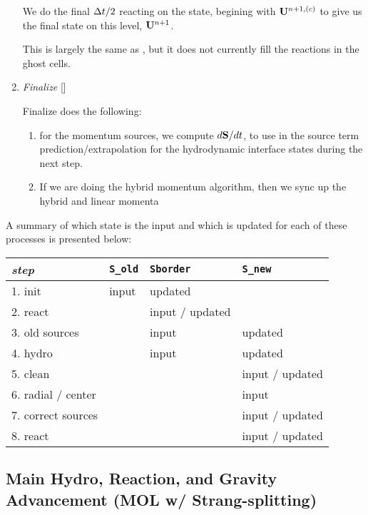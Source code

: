 \begin{enumerate}
  We do the final $\Delta t/2$ reacting on the state, begining with ${\bf U}^{n+1,(c)}$ to
  give us the final state on this level, ${\bf U}^{n+1}$.

  This is largely the same as , but
  it does not currently fill the reactions in the ghost cells. 

\item \label{strang:finalize} {\em Finalize} []

  Finalize does the following:
  \begin{enumerate}
  \item for the momentum sources, we compute $d{\bf S}/dt$, to use in the
    source term prediction/extrapolation for the hydrodynamic
    interface states during the next step.

  \item If we are doing the hybrid momentum algorithm, then we sync up
    the hybrid and linear momenta
  \end{enumerate}

\end{enumerate}

A summary of which state is the input and which is updated for each of
these processes is presented below:
\begin{center}
\renewcommand{\arraystretch}{1.5}
\begin{tabular}{l|lll}
{\em step} & {\tt S\_old} & {\tt Sborder} & {\tt S\_new} \\
\hline
1. init    &   input      &   updated \\
2. react   &              &    input / updated \\
3. old sources &          &   input    & updated \\
4. hydro   &              & input      & updated \\
5. clean   &              &            & input / updated \\
6. radial / center  &     &            & input \\
7. correct sources &      &            & input / updated \\
8. react   &              &            & input / updated
\end{tabular}
\end{center}




\subsection{Main Hydro, Reaction, and Gravity Advancement (MOL w/ Strang-splitting)}

